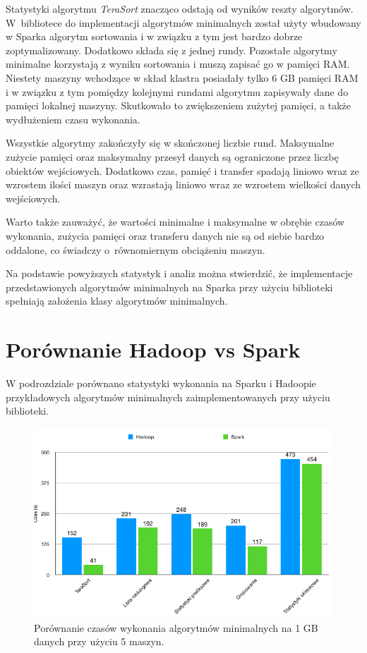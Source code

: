 \documentclass[magisterska]{pracamgr}
\begin{document}
Statystyki algorytmu \textit{TeraSort} znacząco odstają od wyników reszty algorytmów. W~bibliotece do implementacji algorytmów minimalnych został użyty wbudowany w Sparka algorytm sortowania i w związku z tym jest bardzo dobrze zoptymalizowany. Dodatkowo składa się z jednej rundy. Pozostałe algorytmy minimalne korzystają z wyniku sortowania i muszą zapisać go w pamięci RAM. Niestety maszyny wchodzące w skład klastra posiadały tylko 6 GB pamięci RAM i w związku z tym pomiędzy kolejnymi rundami algorytmu zapisywały dane do pamięci lokalnej maszyny. Skutkowało to zwiększeniem zużytej pamięci, a także wydłużeniem czasu wykonania.

Wszystkie algorytmy zakończyły się w skończonej liczbie rund. Maksymalne zużycie pamięci oraz maksymalny przesył danych są ograniczone przez liczbę obiektów wejściowych. Dodatkowo czas, pamięć i transfer spadają liniowo wraz ze wzrostem ilości maszyn oraz wzrastają liniowo wraz ze wzrostem wielkości danych wejściowych.

Warto także zauważyć, że wartości minimalne i maksymalne w obrębie czasów wykonania, zużycia pamięci oraz transferu danych nie są od siebie bardzo oddalone, co świadczy o~równomiernym obciążeniu maszyn.

Na podstawie powyższych statystyk i analiz można stwierdzić, że implementacje przedstawionych algorytmów minimalnych na Sparka przy użyciu biblioteki spełniają założenia klasy algorytmów minimalnych.

\newpage
\section{Porównanie Hadoop vs Spark}

W podrozdziale porównano statystyki wykonania na Sparku i Hadoopie przykładowych algorytmów minimalnych zaimplementowanych przy użyciu biblioteki.

\begin{figure}[H]
\centering
  \caption{Porównanie czasów wykonania algorytmów minimalnych na 1 GB danych przy użyciu 5 maszyn.}
  \includegraphics[width=13cm]{1_5_execution.png}
\end{figure}
\end{document}

